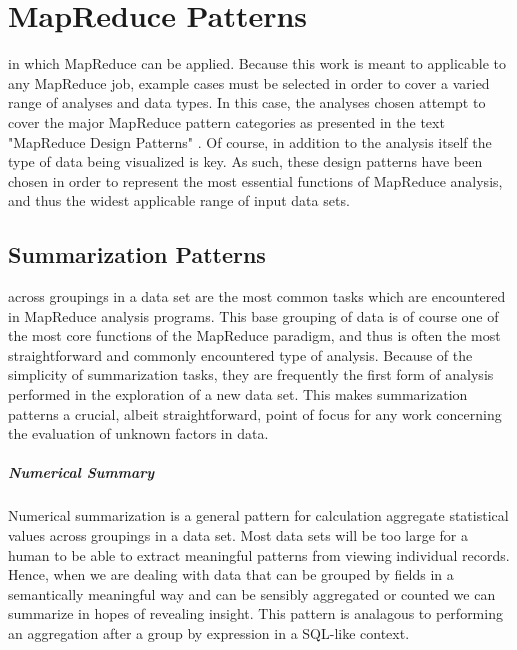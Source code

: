 \chapter{MapReduce Patterns}
\label{sec:mapreducepatterns}
 in which MapReduce can be applied. Because this work is meant to applicable to any MapReduce job, example cases must be selected in order to cover a varied range of analyses and data types. In this case, the analyses chosen attempt to cover the major MapReduce pattern categories as presented in the text "MapReduce Design Patterns" \cite{Miner2012}. Of course, in addition to the analysis itself the type of data being visualized is key. As such, these design patterns have been chosen in order to represent the most essential functions of MapReduce analysis, and thus the widest applicable range of input data sets.

\section{Summarization Patterns}
\label{sec:summarization}
 across groupings in a data set are the most common tasks which are encountered in MapReduce analysis programs. This base grouping of data is of course one of the most core functions of the MapReduce paradigm, and thus is often the most straightforward and commonly encountered type of analysis. Because of the simplicity of summarization tasks, they are frequently the first form of analysis performed in the exploration of a new data set. This makes summarization patterns a crucial, albeit straightforward, point of focus for any work concerning the evaluation of unknown factors in data.

\paragraph{Numerical Summary}
Numerical summarization is a general pattern for calculation aggregate statistical values across groupings in a data set. Most data sets will be too large for a human to be able to extract meaningful patterns from viewing individual records. Hence, when we are dealing with data that can be grouped by fields in a semantically meaningful way and can be sensibly aggregated or counted we can summarize in hopes of revealing insight. This pattern is analagous to performing an aggregation after a group by expression in a SQL-like context.

